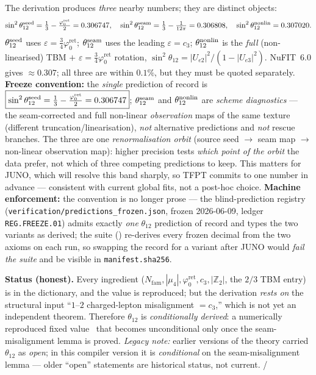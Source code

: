 \documentclass[11pt,a4paper]{article}
\newcommand{\Nfam}{N_{\mathrm{fam}}}
\newcommand{\cthree}{c_3}
\newcommand{\phiz}{\varphi_0^{\mathrm{ret}}}
\newcommand{\Z}{\mathbb{Z}}
\theoremstyle{definition}
\begin{document}
\begin{keybox}
The derivation produces \emph{three} nearby numbers; they are distinct objects:
\[
  \sin^2\theta_{12}^{\rm seed}=\tfrac13-\tfrac{\phiz}{2}=0.306747,\quad
  \sin^2\theta_{12}^{\rm seam}=\tfrac13-\tfrac1{12\pi}=0.306808,\quad
  \sin^2\theta_{12}^{\rm nonlin}=0.307020 .
\]
$\theta_{12}^{\rm seed}$ uses $\varepsilon=\tfrac34\phiz$; $\theta_{12}^{\rm seam}$ uses the leading
$\varepsilon=\cthree$; $\theta_{12}^{\rm nonlin}$ is the \emph{full} (non-linearised) TBM $+$
$\varepsilon=\tfrac34\phiz$ rotation, $\sin^2\theta_{12}=|U_{e2}|^2/(1-|U_{e3}|^2)$. NuFIT~6.0 gives
$\approx0.307$; all three are within $0.1\%$, but they must be quoted separately.
\textbf{Freeze convention:} the \emph{single} prediction of record is
$\boxed{\sin^2\theta_{12}^{\rm seed}=\tfrac13-\tfrac{\phiz}{2}=0.306747}$; $\theta_{12}^{\rm seam}$ and
$\theta_{12}^{\rm nonlin}$ are \emph{scheme diagnostics} --- the seam-corrected and full non-linear
\emph{observation} maps of the same texture (different truncation/linearisation), \emph{not} alternative
predictions and \emph{not} rescue branches. The three are one \emph{renormalisation orbit} (source seed
$\to$ seam map $\to$ non-linear observation map): higher precision tests \emph{which point of the orbit}
the data prefer, not which of three competing predictions to keep. This matters for JUNO, which will
resolve this band sharply, so TFPT commits to one number in advance --- consistent with current global
fits, not a post-hoc choice.
\textbf{Machine enforcement:} the convention is no longer prose --- the blind-prediction registry
(\texttt{verification/predictions\_frozen.json}, frozen 2026-06-09, ledger \texttt{REG.FREEZE.01}) admits
exactly \emph{one} $\theta_{12}$ prediction of record and types the two variants as derived; the suite
() re-derives every frozen decimal from the two axioms on each run, so
swapping the record for a variant after JUNO would \emph{fail the suite} and be visible in
\texttt{manifest.sha256}.
\end{keybox}

\noindent\textbf{Status (honest).} Every ingredient ($\Nfam,|\mu_4|,\phiz,\cthree,|\Z_2|$, the $2/3$ TBM
entry) is in the dictionary, and the value is reproduced; but the derivation \emph{rests on} the structural
input ``$1$--$2$ charged-lepton misalignment $=\cthree$,'' which is not yet an independent theorem.
Therefore $\theta_{12}$ is \emph{conditionally derived}: a numerically reproduced fixed value \mE\ that
becomes unconditional only once the seam-misalignment lemma is proved. \emph{Legacy note:} earlier
versions of the theory carried $\theta_{12}$ as \emph{open}; in this compiler version it is \emph{conditional}
on the seam-misalignment lemma --- older ``open'' statements are historical status, not current. \mE/\mC
\end{document}
